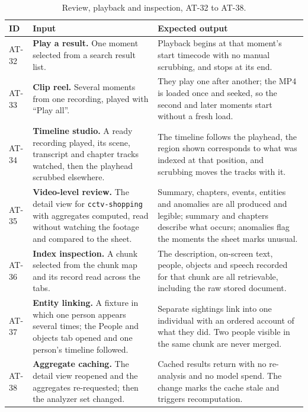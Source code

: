 \documentclass[11pt,a4paper]{article}
\begin{document}
\begin{table}[htbp]
\centering
\scriptsize
\begin{tabularx}{\textwidth}{@{}L{0.85cm}XX@{}}
\toprule
\textbf{ID} & \textbf{Input} & \textbf{Expected output} \\
\midrule
AT-32 & \textbf{Play a result.} One moment selected from a search result list. &
Playback begins at that moment's start timecode with no manual scrubbing, and stops at its
end. \\
AT-33 & \textbf{Clip reel.} Several moments from one recording, played with ``Play all''. &
They play one after another; the MP4 is loaded once and seeked, so the second and later
moments start without a fresh load. \\
AT-34 & \textbf{Timeline studio.} A ready recording played, its scene, transcript and
chapter tracks watched, then the playhead scrubbed elsewhere. &
The timeline follows the playhead, the region shown corresponds to what was indexed at that
position, and scrubbing moves the tracks with it. \\
AT-35 & \textbf{Video-level review.} The detail view for \texttt{cctv-shopping} with
aggregates computed, read without watching the footage and compared to the sheet. &
Summary, chapters, events, entities and anomalies are all produced and legible; summary and
chapters describe what occurs; anomalies flag the moments the sheet marks unusual. \\
AT-36 & \textbf{Index inspection.} A chunk selected from the chunk map and its record read
across the tabs. &
The description, on-screen text, people, objects and speech recorded for that chunk are all
retrievable, including the raw stored document. \\
AT-37 & \textbf{Entity linking.} A fixture in which one person appears several times; the
People and objects tab opened and one person's timeline followed. &
Separate sightings link into one individual with an ordered account of what they did. Two
people visible in the same chunk are never merged. \\
AT-38 & \textbf{Aggregate caching.} The detail view reopened and the aggregates
re-requested; then the analyzer set changed. &
Cached results return with no re-analysis and no model spend. The change marks the cache
stale and triggers recomputation. \\
\bottomrule
\end{tabularx}
\caption{Review, playback and inspection, AT-32 to AT-38.}
\end{table}
\end{document}
